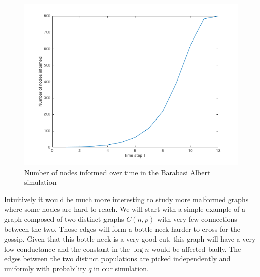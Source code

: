 \documentclass[10pt,journal,a4paper]{IEEEtran}
\begin{document}
\begin{figure}
\centering
\includegraphics[width=1\linewidth]{figs/barabasi-albert-chart}
\caption{Number of nodes informed over time in the Barabasi Albert simulation}
\label{fig:barabasi-albert-chart}
\end{figure}

Intuitively it would be much more interesting to study more malformed graphs where some nodes are hard to reach. We will start with a simple example of a graph composed of two distinct graphs $C(n,p)$ with very few connections between the two. Those edges will form a bottle neck harder to cross for the gossip. Given that this bottle neck is a very good cut, this graph will have a very low conductance and the constant in the $\log n$ would be affected badly. The edges between the two distinct populations are picked independently and uniformly with probability $q$ in our simulation.
\end{document}
